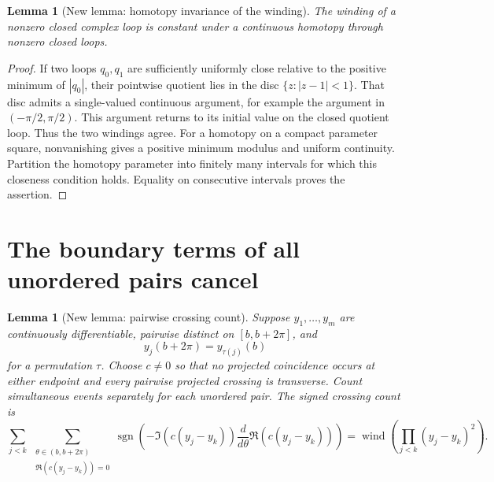 \documentclass[11pt,oneside]{report}
\newtheorem{lemma}[theorem]{Lemma}
\theoremstyle{definition}
\numberwithin{equation}{section}
\newcommand{\wind}{\operatorname{wind}}
\begin{document}
\begin{lemma}[New lemma: homotopy invariance of the winding]
\label{J15:lem:homotopy}
The winding of a nonzero closed complex loop is constant under a continuous
homotopy through nonzero closed loops.
\end{lemma}

\begin{proof}
If two loops $q_0,q_1$ are sufficiently uniformly close relative to the
positive minimum of $|q_0|$, their pointwise quotient lies in the disc
$\{z:|z-1|<1\}$. That disc admits a single-valued continuous argument,
for example the argument in $(-\pi/2,\pi/2)$. This argument returns to
its initial value on the closed quotient loop. Thus the two windings agree.
For a homotopy on a compact parameter square, nonvanishing gives a positive
minimum modulus and uniform continuity. Partition the homotopy parameter
into finitely many intervals for which this closeness condition holds.
Equality on consecutive intervals proves the assertion.
\end{proof}

\section{The boundary terms of all unordered pairs cancel}

\begin{lemma}[New lemma: pairwise crossing count]
\label{J15:lem:pair-count}
Suppose $y_1,\ldots,y_m$ are continuously differentiable, pairwise distinct
on $[b,b+2\pi]$, and
\[
 y_j(b+2\pi)=y_{\tau(j)}(b)
\]
for a permutation $\tau$. Choose $c\ne0$ so that no projected coincidence
occurs at either endpoint and every pairwise projected crossing is
transverse. Count simultaneous events separately for each unordered pair.
The signed crossing count is
\begin{equation}\label{J15:eq:pair-winding}
 \sum_{j<k}\ \sum_{\substack{\theta\in(b,b+2\pi)\\
                 \Re(c(y_j-y_k))=0}}
  \operatorname{sgn}\!\left(-\Im(c(y_j-y_k))
       \frac d{d\theta}\Re(c(y_j-y_k))\right)
 =\wind\!\left(\prod_{j<k}(y_j-y_k)^2\right).
\end{equation}
\end{lemma}
\end{document}
